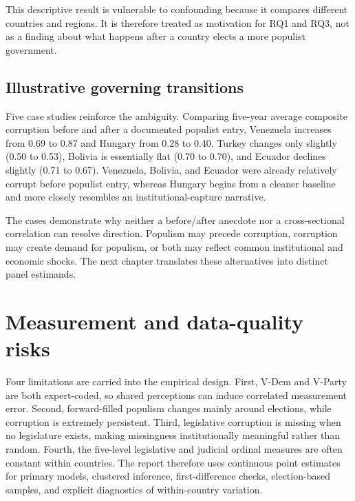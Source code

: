 This descriptive result is vulnerable to confounding because it compares different countries and
regions. It is therefore treated as motivation for RQ1 and RQ3, not as a finding about what happens
after a country elects a more populist government.

\subsection{Illustrative governing transitions}

Five case studies reinforce the ambiguity. Comparing five-year average composite corruption before
and after a documented populist entry, Venezuela increases from 0.69 to 0.87 and Hungary from 0.28 to
0.40. Turkey changes only slightly (0.50 to 0.53), Bolivia is essentially flat (0.70 to 0.70), and
Ecuador declines slightly (0.71 to 0.67). Venezuela, Bolivia, and Ecuador were already relatively
corrupt before populist entry, whereas Hungary begins from a cleaner baseline and more closely
resembles an institutional-capture narrative.

The cases demonstrate why neither a before/after anecdote nor a cross-sectional correlation can
resolve direction. Populism may precede corruption, corruption may create demand for populism, or both
may reflect common institutional and economic shocks. The next chapter translates these alternatives
into distinct panel estimands.

\section{Measurement and data-quality risks}

Four limitations are carried into the empirical design. First, V-Dem and V-Party are both
expert-coded, so shared perceptions can induce correlated measurement error. Second, forward-filled
populism changes mainly around elections, while corruption is extremely persistent. Third,
legislative corruption is missing when no legislature exists, making missingness institutionally
meaningful rather than random. Fourth, the five-level legislative and judicial ordinal measures are
often constant within countries. The report therefore uses continuous point estimates for primary
models, clustered inference, first-difference checks, election-based samples, and explicit diagnostics
of within-country variation.
